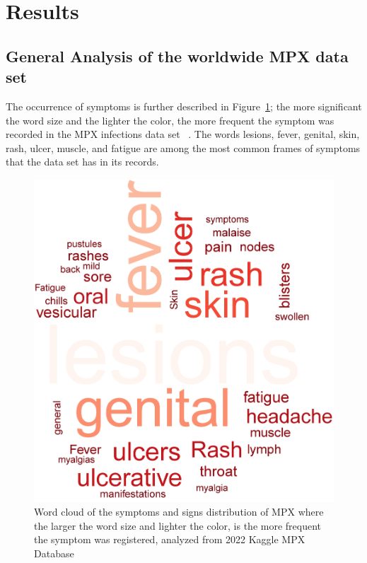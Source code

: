 \documentclass[conference]{IEEEtran}
\begin{document}
\section{Results}
\subsection{General Analysis of the worldwide MPX data set}

The occurrence of symptoms is further described in Figure~\ref{fig:SymptomsWordcloud}; the more significant the word size and the lighter the color, the more frequent the symptom was recorded in the MPX infections data set ~\cite{Contractor2022}. The words lesions, fever, genital, skin, rash, ulcer, muscle, and fatigue are among the most common frames of symptoms that the data set has in its records.
\begin{figure}[H]
    \centering
    \includegraphics[width = 7 cm]{SymptomsWordcloud.png}
    \caption{Word cloud of the symptoms and signs distribution of MPX where the larger the word size and lighter the color, is the more frequent the symptom was registered, analyzed from 2022 Kaggle MPX Database~\cite{Contractor2022}}
    \label{fig:SymptomsWordcloud}
\end{figure}
\end{document}
